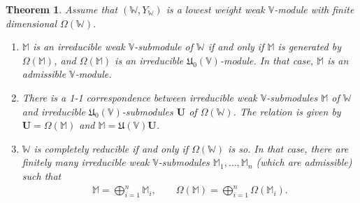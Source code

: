 \documentclass[12pt,b5paper,notitlepage]{report}
\theoremstyle{definition}
\theoremstyle{plain}
\newtheorem{thm}[df]{Theorem}
\newcommand{\fk}{\mathfrak}
\newcommand{\mbf}{\mathbf}
\newcommand{\Vbb}{\mathbb V}
\newcommand{\Wbb}{\mathbb W}
\newcommand{\Mbb}{\mathbb M}
\numberwithin{equation}{section}
\begin{document}
\begin{thm}\label{lb102}
Assume that $(\Wbb,Y_\Wbb)$ is a lowest weight weak $\Vbb$-module with finite dimensional $\Omega(\Wbb)$.
\begin{enumerate}[label=(\arabic*)] 
\item $\Mbb$ is an irreducible weak $\Vbb$-submodule of $\Wbb$ if and only if $\Mbb$ is generated by $\Omega(\Mbb)$, and $\Omega(\Mbb)$ is an irreducible $\fk U_0(\Vbb)$-module.  In that case, $\Mbb$ is an admissible $\Vbb$-module.

\item There is a 1-1 correspondence between irreducible weak $\Vbb$-submodules $\Mbb$ of $\Wbb$ and irreducible $\fk U_0(\Vbb)$-submodules $\mbf U$ of $\Omega(\Wbb)$. The relation is given by $\mbf U=\Omega(\Mbb)$ and $\Mbb=\fk U(\Vbb)\mbf U$.



\item $\Wbb$ is completely reducible if and only if $\Omega(\Wbb)$ is so. In that case, there are finitely many irreducible weak $\Vbb$-submodules  $\Mbb_1,\dots,\Mbb_n$ (which are admissible) such that
\begin{gather*}
\Mbb=\bigoplus_{i=1}^n\Mbb_i,\qquad\Omega(\Mbb)=\bigoplus_{i=1}^n\Omega(\Mbb_i).
\end{gather*}
\end{enumerate}	
\end{thm}
\end{document}
